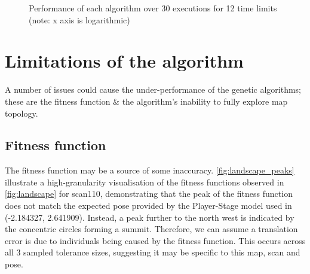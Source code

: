 \documentclass[authoryearcitations]{UoYCSproject}
\begin{document}
\begin{figure}
	\caption[Global-ICP performance against Grid Initialisation] {Performance of each algorithm over 30 executions for 12 time limits (note: x axis is logarithmic)}
	\label{fig:icp_vs_grid_box_whiskers}
\end{figure}






\section{Limitations of the algorithm}
\label{sec:algorithm_limitations}
A number of issues could cause the under-performance of the genetic algorithms; these are the fitness function \& the algorithm's inability to fully explore map topology.

\subsection{Fitness function}
\label{subsec:criticism_fitness_func}
The fitness function may be a source of some inaccuracy. \autoref{fig:landscape_peaks} illustrate a high-granularity visualisation of the fitness functions observed in \autoref{fig:landscape} for scan110, demonstrating that the peak of the fitness function does not match the expected pose provided by the Player-Stage model used in \citet{Lenac2011-co}(-2.184327, 2.641909). Instead, a peak further to the north west is indicated by the concentric circles forming a summit. Therefore, we can assume a translation error is due to individuals being caused by the fitness function. This occurs across all 3 sampled tolerance sizes, suggesting it may be specific to this map, scan and pose.
\end{document}
